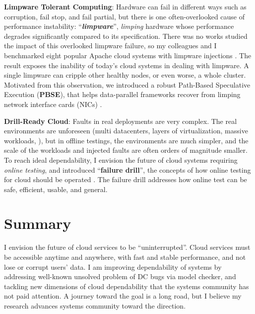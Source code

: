 \documentclass[11pt]{article}
\begin{document}

\noindent
\textbf{Limpware Tolerant Computing}: Hardware can fail in different ways such as
corruption, fail stop, and fail partial, but there is one often-overlooked
cause of performance instability: ``\textbf{\textit{limpware}}'',
\textit{limping} hardware whose performance degrades significantly compared to
its specification.  There was no works studied the impact of this overlooked
limpware failure, so my colleagues and I benchmarked eight popular Apache cloud
systems with limpware injections \cite{Do+13-Limplock}. The result exposes the
inability of today's cloud systems in dealing with limpware. A single limpware
can cripple other healthy nodes, or even worse, a whole cluster.  Motivated
from this observation, we introduced a robust Path-Based Speculative Execution
(\textbf{PBSE}), that helps data-parallel frameworks recover from limping
network interface cards (NICs) \cite{Suminto+17-PBSE-InPrep}.


\noindent
\textbf{Drill-Ready Cloud}: Faults in real deployments are very complex. The
real environments are unforeseen (multi datacenters, layers of virtualization,
massive workloads, \etc), but in offline testings, the environments are much
simpler, and the scale of the workloads and injected faults are often orders of
magnitude smaller. To reach ideal dependability, I envision the future of cloud
systems requiring \textit{online testing}, and introduced ``\textbf{failure
drill}'', the concepts of how online testing for cloud should be operated
\cite{Leesatapornwongsa+14-Drill-fixed}.  The failure drill addresses how
online test can be safe, efficient, usable, and general.

\section{Summary}

I envision the future of cloud services to be ``uninterrupted''. Cloud services
must be accessible anytime and anywhere, with fast and stable performance, and
not lose or corrupt users' data.
%
I am improving dependability of systems by addressing well-known unsolved
problem of DC bugs via model checker, and tackling new dimensions of cloud
dependability that the systems community has not paid attention. A journey
toward the goal is a long road, but I believe my research advances systems
community toward the direction. 


\end{document}
